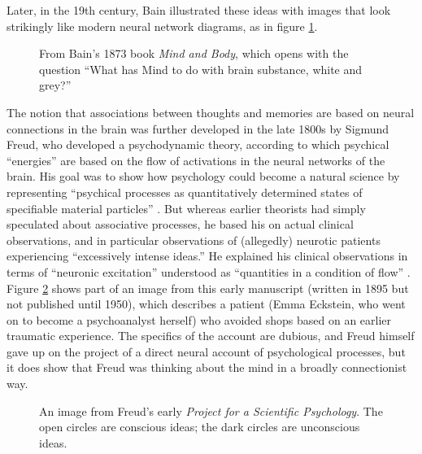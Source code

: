 Later, in the 19th century, Bain illustrated these ideas with images that look strikingly like modern neural network diagrams, as in figure \ref{bain}.

\begin{figure}[h]
\centering
{}
\caption[{From \cite[pp.~110--111]{bain1873mind}.}]{From Bain's 1873 book \emph{Mind and Body}, which opens with the question ``What has Mind to do with brain substance, white and grey?''}
\label{bain}
\end{figure}

The notion that associations between thoughts and memories are based on neural connections in the brain was further developed in the late 1800s by Sigmund Freud, who developed a psychodynamic theory, according to which  psychical ``energies'' are based on the flow of activations in the neural networks of the brain. His goal was to show how psychology could become a natural science by representing ``psychical processes as quantitatively determined states of specifiable material particles'' \cite[p.~355]{freud1954project}. But whereas earlier theorists had simply speculated about associative processes, he based his on actual  clinical observations, and in particular observations of (allegedly) neurotic patients experiencing ``excessively intense ideas.''  He explained his clinical observations in terms of ``neuronic excitation'' understood as ``quantities in a condition of flow'' \cite[p.~356]{freud1954project}. Figure \ref{freud} shows part of an image from this early manuscript (written in 1895 but not published until 1950), which describes a patient (Emma Eckstein, who went on to become a psychoanalyst herself) who avoided shops based on an earlier traumatic experience. The specifics of the account are dubious, and Freud himself gave up on the project of a direct neural account of psychological processes,  but it does show that Freud was thinking about the mind in a broadly connectionist way.

\begin{figure}[h]
\centering
{}
\caption[From \cite{freud1954project}.]{An image from Freud's early \emph{Project for a Scientific Psychology}. The open circles are conscious ideas; the dark circles are unconscious ideas. }
\label{freud}
\end{figure}


